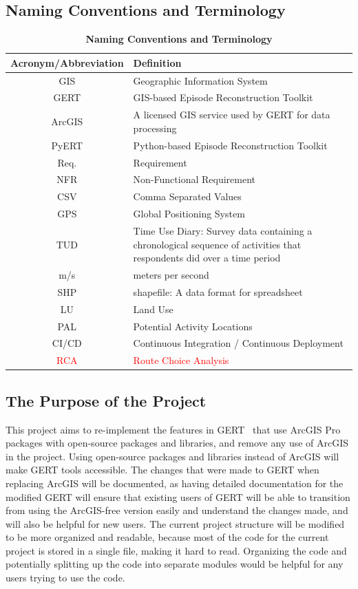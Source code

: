 \documentclass[12pt, titlepage]{article}
\begin{document}
\subsection{Naming Conventions and Terminology}
\begin{table}[h]
\centering
\begin{tabular}{|c|p{10cm}|}
 \hline
 {\bf Acronym/Abbreviation} & {\bf Definition} \\
 \hline
 GIS & Geographic Information System \\
 \hline
 GERT & GIS-based Episode Reconstruction Toolkit  \\ 
\hline
 ArcGIS & A licensed GIS service used by GERT for data processing \\
 \hline
 PyERT & Python-based Episode Reconstruction Toolkit  \\ 
 \hline
 Req. & Requirement  \\
 \hline
 NFR & Non-Functional Requirement  \\
 \hline 
 CSV & Comma Separated Values \\
 \hline
 GPS & Global Positioning System \\
 \hline
 TUD & Time Use Diary:  Survey data containing a chronological sequence of activities that respondents did over a time period\\
 \hline
 m/s & meters per second\\
 \hline
 SHP & shapefile: A data format for spreadsheet \\ 
 \hline
 LU & Land Use \\ 
 \hline
 PAL & Potential Activity Locations \\ 
 \hline
 CI/CD & Continuous Integration / Continuous Deployment\\
 \hline
 \textcolor{red}{RCA} & \textcolor{red}{Route Choice Analysis} \\
 \hline
\end{tabular}
\caption{\bf Naming Conventions and Terminology}
\end{table}

    \subsection{The Purpose of the Project}
This project aims to re-implement the features in GERT~\citep{DALUMPINES2018121} that use ArcGIS Pro packages with
open-source packages and libraries, and remove any use of ArcGIS in the project. Using open-source packages and libraries instead of ArcGIS will make GERT tools accessible. The changes that were made to GERT when replacing ArcGIS will be documented, as having detailed documentation for the modified GERT will ensure that existing users of GERT will be able to transition from using the ArcGIS-free version easily and understand the changes made, and will also be helpful for new users. The current project structure will be modified to be more organized and readable, because most of the code for the current project is stored in a single file, making it hard to read. Organizing the code and potentially splitting up the code into separate modules would be helpful for any users trying to use the code.
\end{document}

